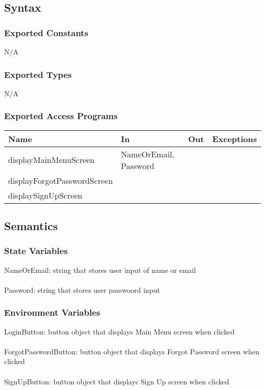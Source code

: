 \documentclass[12pt, titlepage]{article}
\begin{document}
\subsection{Syntax}

\subsubsection{Exported Constants}
N/A

\subsubsection{Exported Types}
N/A

\subsubsection{Exported Access Programs}

\begin{tabular}{| l | l | l | l |}
	\hline
	{\textbf{Name}} & {\textbf{In}} & {\textbf{Out}} & {\textbf{Exceptions}}\\
	\hline
	{displayMainMenuScreen} & NameOrEmail, Password& & \\
	\hline
	{displayForgotPasswordScreen} & & & \\
	\hline
	{displaySignUpScreen} & & & \\
	\hline
\end{tabular}

\subsection{Semantics}

\subsubsection{State Variables}
NameOrEmail: string that stores user input of name or email\\\\
Password: string that stores user passwoord input

\subsubsection{Environment Variables}
LoginButton: button object that displays Main Menu screen when clicked\\\\
ForgotPasswordButton: button object that displays Forgot Password screen when clicked\\\\
SignUpButton: button object that displays Sign Up screen when clicked
\end{document}

